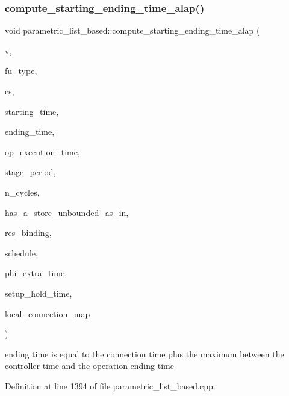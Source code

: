 \subsubsection{\texorpdfstring{compute\+\_\+starting\+\_\+ending\+\_\+time\+\_\+alap()}{compute\_starting\_ending\_time\_alap()}}
{\footnotesize\ttfamily void parametric\+\_\+list\+\_\+based\+::compute\+\_\+starting\+\_\+ending\+\_\+time\+\_\+alap (\begin{DoxyParamCaption}\item[{const \hyperlink{graph_8hpp_abefdcf0544e601805af44eca032cca14}{vertex}}]{v,  }\item[{const unsigned int}]{fu\+\_\+type,  }\item[{const Control\+Step}]{cs,  }\item[{double \&}]{starting\+\_\+time,  }\item[{double \&}]{ending\+\_\+time,  }\item[{double \&}]{op\+\_\+execution\+\_\+time,  }\item[{double \&}]{stage\+\_\+period,  }\item[{unsigned int \&}]{n\+\_\+cycles,  }\item[{bool \&}]{has\+\_\+a\+\_\+store\+\_\+unbounded\+\_\+as\+\_\+in,  }\item[{\hyperlink{fu__binding_8hpp_a619181df8ab98d7b7e17de58ac44b065}{fu\+\_\+binding\+Ref}}]{res\+\_\+binding,  }\item[{const \hyperlink{schedule_8hpp_a85e4dea8a1611026193d8ca13fc5a260}{Schedule\+Const\+Ref}}]{schedule,  }\item[{double \&}]{phi\+\_\+extra\+\_\+time,  }\item[{double}]{setup\+\_\+hold\+\_\+time,  }\item[{\hyperlink{custom__map_8hpp_a18ca01763abbe3e5623223bfe5aaac6b}{Custom\+Map}$<$ std\+::pair$<$ unsigned int, unsigned int $>$, double $>$ \&}]{local\+\_\+connection\+\_\+map }\end{DoxyParamCaption})\hspace{0.3cm}{\ttfamily [private]}}

ending time is equal to the connection time plus the maximum between the controller time and the operation ending time 

Definition at line 1394 of file parametric\+\_\+list\+\_\+based.\+cpp.



